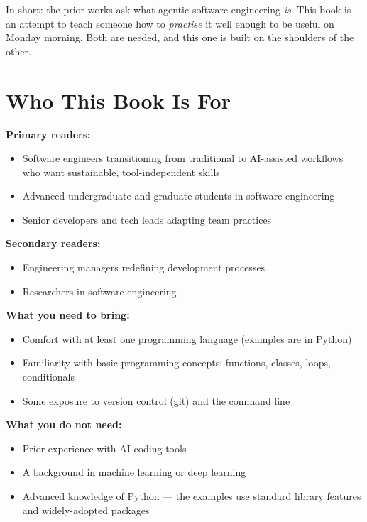 \documentclass[11pt,a4paper]{book}
\begin{document}
In short: the prior works ask what agentic software engineering \textit{is}. This book is an attempt to teach someone how to \textit{practise} it well enough to be useful on Monday morning. Both are needed, and this one is built on the shoulders of the other.

\medskip

\section{Who This Book Is For}

\textbf{Primary readers:}
\begin{itemize}
  \item Software engineers transitioning from traditional to AI-assisted workflows who want sustainable, tool-independent skills
  \item Advanced undergraduate and graduate students in software engineering
  \item Senior developers and tech leads adapting team practices
\end{itemize}

\textbf{Secondary readers:}
\begin{itemize}
  \item Engineering managers redefining development processes
  \item Researchers in software engineering
\end{itemize}

\textbf{What you need to bring:}
\begin{itemize}
  \item Comfort with at least one programming language (examples are in Python)
  \item Familiarity with basic programming concepts: functions, classes, loops, conditionals
  \item Some exposure to version control (git) and the command line
\end{itemize}

\textbf{What you do not need:}
\begin{itemize}
  \item Prior experience with AI coding tools
  \item A background in machine learning or deep learning
  \item Advanced knowledge of Python --- the examples use standard library features and widely-adopted packages
\end{itemize}

\medskip
\end{document}
